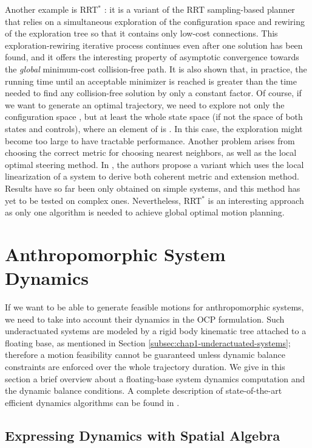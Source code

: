 Another example is RRT$^*$ \cite{Karaman2011}: it is a variant of the
RRT sampling-based planner that relies on a simultaneous exploration
of the configuration space and rewiring of the exploration tree so
that it contains only low-cost connections. This exploration-rewiring
iterative process continues even after one solution has been found,
and it offers the interesting property of asymptotic convergence
towards the \emph{global} minimum-cost collision-free path. It is also
shown that, in practice, the running time until an acceptable
minimizer is reached is greater than the time needed to find any
collision-free solution by only a constant factor. Of course, if we
want to generate an optimal trajectory, we need to explore not only
the configuration space {\cspace}, but at least the whole state space
{\sspace} (if not the space of both states and controls), where an
element of {\sspace} is \state{}. In this case, the exploration might
become too large to have tractable performance. Another problem arises
from choosing the correct metric for choosing nearest neighbors, as
well as the local optimal steering method. In \cite{Perez2012}, the
authors propose a variant which uses the local linearization of a
system to derive both coherent metric and extension method. Results
have so far been only obtained on simple systems, and this method has
yet to be tested on complex ones. Nevertheless, RRT$^*$ is an
interesting approach as only one algorithm is needed to achieve global
optimal motion planning.

\section{Anthropomorphic System Dynamics}

If we want to be able to generate feasible motions for anthropomorphic
systems, we need to take into account their dynamics in the OCP
formulation. Such underactuated systems are modeled by a rigid body
kinematic tree attached to a floating base, as mentioned in Section
\ref{subsec:chap1-underactuated-systems}; therefore a motion
feasibility cannot be guaranteed unless dynamic balance constraints
are enforced over the whole trajectory duration. We give in this
section a brief overview about a floating-base system dynamics
computation and the dynamic balance conditions. A complete description
of state-of-the-art efficient dynamics algorithms can be found in
\cite{feat08}.

\subsection{Expressing Dynamics with Spatial Algebra}

